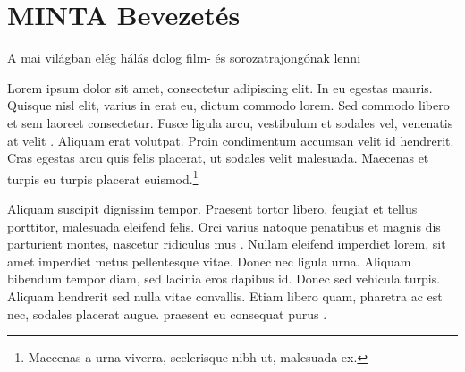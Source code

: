\chapter{MINTA Bevezetés} %
\label{ch:intro}

A mai világban elég hálás dolog film- és sorozatrajongónak lenni

Lorem ipsum dolor sit amet, consectetur adipiscing elit. In eu egestas mauris. Quisque nisl elit, varius in erat eu, dictum commodo lorem. Sed commodo libero et sem laoreet consectetur. Fusce ligula arcu, vestibulum et sodales vel, venenatis at velit \cite{dahl1972structured}. Aliquam erat volutpat. Proin condimentum accumsan velit id hendrerit. Cras egestas arcu quis felis placerat, ut sodales velit malesuada. Maecenas et turpis eu turpis placerat euismod.\footnote{Maecenas a urna viverra, scelerisque nibh ut, malesuada ex.}

Aliquam suscipit dignissim tempor. Praesent tortor libero, feugiat et tellus porttitor, malesuada eleifend felis. Orci varius natoque penatibus et magnis dis parturient montes, nascetur ridiculus mus \cite{cormen2009algorithms,krasner1988mvc}. Nullam eleifend imperdiet lorem, sit amet imperdiet metus pellentesque vitae. Donec nec ligula urna. Aliquam bibendum tempor diam, sed lacinia eros dapibus id. Donec sed vehicula turpis. Aliquam hendrerit sed nulla vitae convallis. Etiam libero quam, pharetra ac est nec, sodales placerat augue. \citeauthor{dijkstra1979goto} praesent eu consequat purus \cite{dijkstra1979goto}.
